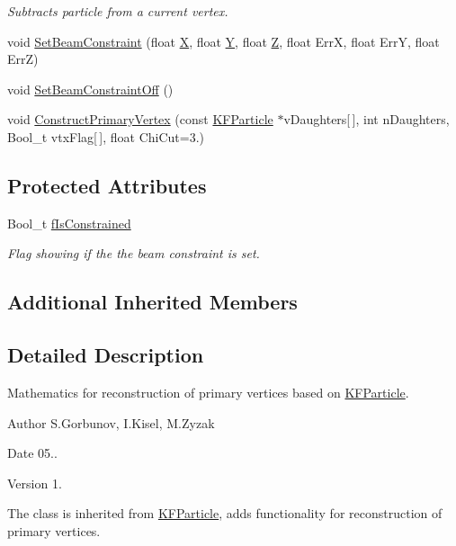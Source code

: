\begin{DoxyCompactItemize}
\begin{DoxyCompactList}\small\item\em Subtracts particle from a current vertex. \end{DoxyCompactList}\item 
void \hyperlink{classKFVertex_a7b38221467e21270dd68cc3d7928393c}{Set\+Beam\+Constraint} (float \hyperlink{classKFParticleBase_af624ef17e57f675476a2a0e597ce2983}{X}, float \hyperlink{classKFParticleBase_ad7d7e1a209955c43efac37d6136ac406}{Y}, float \hyperlink{classKFParticleBase_a96e631c939d83ff67c82701ed8255200}{Z}, float ErrX, float ErrY, float ErrZ)
\item 
void \hyperlink{classKFVertex_a5e50ebe906e13c95e6bde55668a35565}{Set\+Beam\+Constraint\+Off} ()
\item 
void \hyperlink{classKFVertex_a0398208d64532d964a2c6c4c061c349c}{Construct\+Primary\+Vertex} (const \hyperlink{classKFParticle}{K\+F\+Particle} $\ast$v\+Daughters\mbox{[}$\,$\mbox{]}, int n\+Daughters, Bool\+\_\+t vtx\+Flag\mbox{[}$\,$\mbox{]}, float Chi\+Cut=3.)
\end{DoxyCompactItemize}
\subsection*{Protected Attributes}
\begin{DoxyCompactItemize}
\item 
Bool\+\_\+t \hyperlink{classKFVertex_a5da11170d128a3adf9a0f2f672694b9e}{f\+Is\+Constrained}\hypertarget{classKFVertex_a5da11170d128a3adf9a0f2f672694b9e}{}\label{classKFVertex_a5da11170d128a3adf9a0f2f672694b9e}

\begin{DoxyCompactList}\small\item\em Flag showing if the the beam constraint is set. \end{DoxyCompactList}\end{DoxyCompactItemize}
\subsection*{Additional Inherited Members}


\subsection{Detailed Description}
Mathematics for reconstruction of primary vertices based on \hyperlink{classKFParticle}{K\+F\+Particle}. 

\begin{DoxyAuthor}{Author}
S.\+Gorbunov, I.\+Kisel, M.\+Zyzak 
\end{DoxyAuthor}
\begin{DoxyDate}{Date}
05.. 
\end{DoxyDate}
\begin{DoxyVersion}{Version}
1.
\end{DoxyVersion}
The class is inherited from \hyperlink{classKFParticle}{K\+F\+Particle}, adds functionality for reconstruction of primary vertices. 

